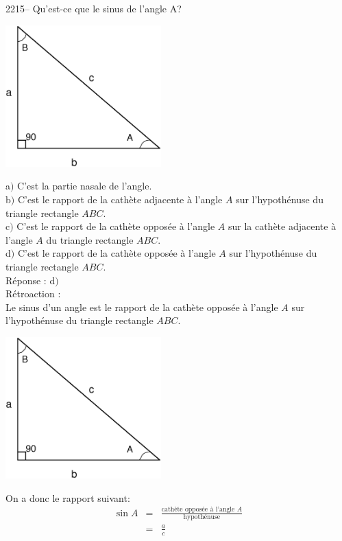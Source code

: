 \documentclass[letterpaper, 12pt]{article}
\begin{document}
2215-- Qu'est-ce que le sinus de l'angle A? \\
\begin{center}
 \includegraphics[width=6cm,bb=14 14 591 533]{Triangle_rectangle2.eps}
\end{center}
a$)$ C'est la partie nasale de l'angle.\\
b$)$ C'est le rapport de la cath\`ete adjacente \`a l'angle $A$ sur l'hypoth\'enuse du triangle rectangle $ABC$.\\
c$)$ C'est le rapport de la cath\`ete oppos\'ee \`a l'angle $A$ sur la cath\`ete adjacente \`a l'angle $A$ du triangle rectangle $ABC$.\\
d$)$ C'est le rapport de la cath\`ete oppos\'ee \`a l'angle $A$ sur l'hypoth\'enuse du triangle rectangle $ABC$.\\

R\'eponse : d$)$\\

R\'etroaction :\\
Le sinus d'un angle est le rapport de la cath\`ete oppos\'ee \`a l'angle $A$ sur l'hypoth\'enuse du triangle rectangle $ABC$.\\
\begin{center}
 \includegraphics[width=6cm,bb=14 14 591 533]{Triangle_rectangle2.eps}
\end{center}
On a donc le rapport suivant:
\begin{eqnarray*}
 \sin{A} &=&\frac{\textrm{cath\`ete oppos\'ee \`a l'angle $A$}}{\textrm{hypoth\'enuse}}\\
&=&\frac{a}{c}
\end{eqnarray*}
\end{document}
